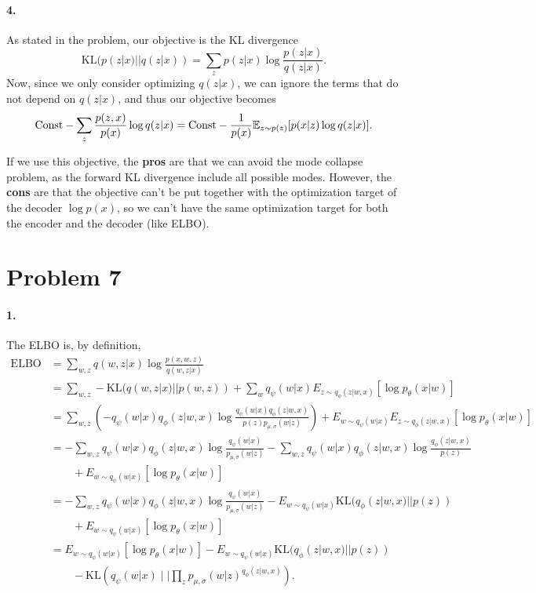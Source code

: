 \documentclass[a4 paper,12pt]{article}
\begin{document}
\paragraph*{4.}
As stated in the problem, our objective is the KL divergence
\[
\text{KL}(p(z|x)||q(z|x))=\sum_z{p(z|x)}\log \frac{p(z|x)}{q(z|x)}.
\] Now, since we only consider optimizing $q(z|x)$, we can ignore the terms that do not depend on $q(z|x)$, and thus our objective becomes
\[
\text{Const}-\sum_z\frac{p(z,x)}{p(x)}\log q(z|x)=\text{Const}-\frac{1}{p(x)}\mathbb{E}_{z\sim p(z)}[p(x|z)\log q(z|x)].
\]

If we use this objective, the \textbf{pros} are that we can avoid the mode collapse problem, as the forward KL divergence include all possible modes. However, the \textbf{cons} are that the objective can't be put together with the optimization target of the decoder $\log p(x)$, so we can't have the same optimization target for both the encoder and the decoder (like ELBO).

\section*{Problem 7}
\paragraph*{1.} The ELBO is, by definition,
\begin{align*}
\text{ELBO}&=\sum_{w,z} q(w,z|x)\log \frac{p(x,w,z)}{q(w,z|x)}\\
&=\sum_{w,z}-\text{KL}(q(w,z|x)||p(w,z))+\sum_w q_{\psi}(w|x)E_{z\sim q_{\phi}(z|w,x)}[\log p_{\theta}(x|w)]\\
&=\sum_{w,z} \left(-q_{\psi}(w|x)q_{\phi}(z|w,x)\log \frac{q_{\psi}(w|x)q_{\phi}(z|w,x)}{p(z)p_{\mu,\sigma}(w|z)}\right)+E_{w\sim q_{\psi}(w|x)}E_{z\sim q_{\phi}(z|w,x)}[\log p_{\theta}(x|w)] \\
&=-\sum_{w,z} q_{\psi}(w|x)q_{\phi}(z|w,x)\log \frac{q_{\psi}(w|x)}{p_{\mu,\sigma}(w|z)} -\sum_{w,z}q_{\psi}(w|x)q_{\phi}(z|w,x)\log \frac{q_{\phi}(z|w,x)}{p(z)}\\
&\qquad +E_{w\sim q_{\psi}(w|x)}[\log p_{\theta}(x|w)]\\
&=-\sum_{w,z} q_{\psi}(w|x)q_{\phi}(z|w,x)\log \frac{q_{\psi}(w|x)}{p_{\mu,\sigma}(w|z)} -E_{w\sim q_{\psi}(w|x)}\text{KL}(q_{\phi}(z|w,x)||p(z))\\
&\qquad +E_{w\sim q_{\psi}(w|x)}[\log p_{\theta}(x|w)]\\
&=E_{w\sim q_{\psi}(w|x)}[\log p_{\theta}(x|w)]-E_{w\sim q_{\psi}(w|x)}\text{KL}(q_{\phi}(z|w,x)||p(z))\\
&\qquad -\text{KL}(q_{\psi}(w|x)\mid\mid {\prod_z p_{\mu,\sigma}(w|z)^{q_{\phi}(z|w,x)}}).
\end{align*}
\end{document}
